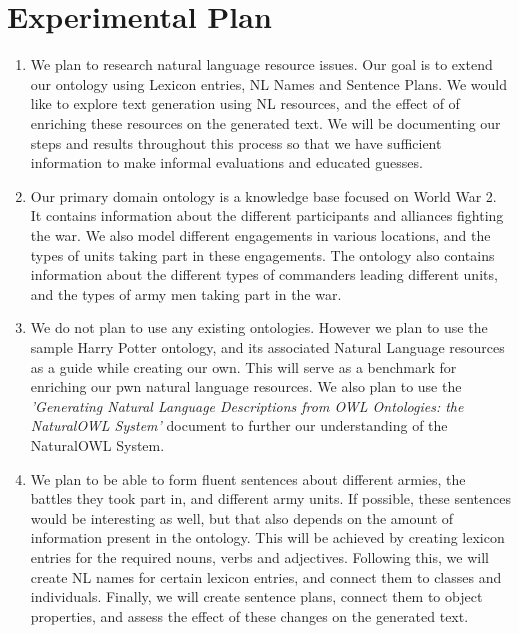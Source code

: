 \documentclass[12pt, letterpaper]{article}
\title{
\vspace{2in}
\textmd{\textbf{\hmwkTitle\\ \large\hmwkClass}}\\
\normalsize\vspace{0.1in}\large{\groupMemberOne}\\
\normalsize\vspace{0.1in}\large{\groupMemberTwo}\\
\normalsize\vspace{0.1in}\large{\groupMemberThree}\\
\normalsize\vspace{0.1in}\large{\groupMemberFour}\\
\vspace{3in}
}
\begin{document}
  \maketitle
  \newpage

  \section*{Experimental Plan}

  	\begin{enumerate}
  		\item
  		We plan to research natural language resource issues. 
      Our goal is to extend our ontology using Lexicon entries, NL Names and Sentence Plans.
  		We would like to explore text generation using NL resources, and the effect of of enriching these resources 
      on the generated text.
  		We will be documenting our steps and results throughout this process so that we have sufficient information 
      to make informal evaluations and educated guesses.

  		\item
  		Our primary domain ontology is a knowledge base focused on World War 2.
      It contains information about the different participants and alliances fighting the war.
      We also model different engagements in various locations, and the types of units taking part in these engagements.
      The ontology also contains information about the different types of commanders leading different units, and
      the types of army men taking part in the war.

  		\item
      We do not plan to use any existing ontologies. However we plan to use the sample Harry Potter ontology, and its 
      associated Natural Language resources as a guide while creating our own. 
      This will serve as a benchmark for enriching our pwn natural language resources. 
      We also plan to use the \textit{'Generating Natural Language Descriptions from OWL Ontologies: the NaturalOWL System'} 
      document to further our understanding of the NaturalOWL System.

  		\item
      We plan to be able to form fluent sentences about different armies, the battles they took part in, and different
      army units.
      If possible, these sentences would be interesting as well, but that also depends on the amount of information
      present in the ontology.
      This will be achieved by creating lexicon entries for the required nouns, verbs and adjectives.
      Following this, we will create NL names for certain lexicon entries, and connect them to classes and individuals.
      Finally, we will create sentence plans, connect them to object properties, and assess the effect of these changes 
      on the generated text.


\end{enumerate}
\end{document}
